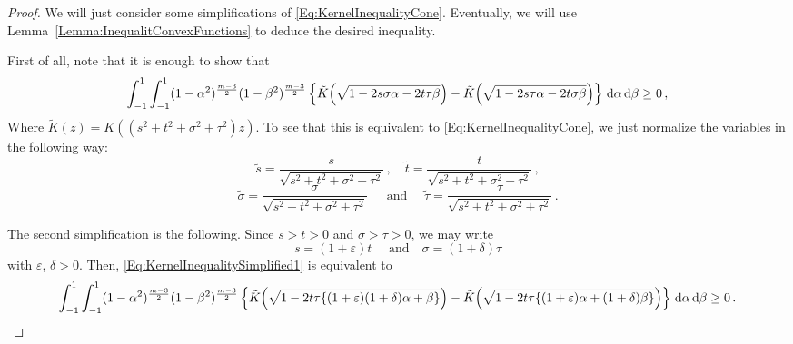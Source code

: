 \begin{proof}
We will just consider some simplifications of \eqref{Eq:KernelInequalityCone}. Eventually, we will
use Lemma~\ref{Lemma:InequalitConvexFunctions} to deduce the desired inequality.

First of all, note that it is enough to show that
\begin{equation}
\label{Eq:KernelInequalitySimplified1}
\int_{-1}^1  \int_{-1}^1  (1-\alpha^2)^{\frac{m-3}{2}} (1-\beta^2)^{\frac{m-3}{2}}  \left \{\tilde{K}\Big(\sqrt{1 -2 s \sigma \alpha -2 t \tau \beta}\Big) - \tilde{K}\Big(\sqrt{1 -2 s \tau \alpha -2 t \sigma \beta}\Big)  \right \}\,\mathrm{d} \alpha \,\mathrm{d} \beta \geq 0\,,
\end{equation}
Where $\tilde{K}(z) = K((s^2 + t^2 + \sigma^2 + \tau^2)z)$. To see that this is equivalent to
\eqref{Eq:KernelInequalityCone}, we just normalize the variables in the following way:
$$
\tilde{s} = \dfrac{s}{\sqrt{s^2 + t^2 + \sigma^2 + \tau^2}}\,, \quad \tilde{t} = \dfrac{t}{\sqrt{s^2 + t^2 + \sigma^2 + \tau^2}}\,,
$$
$$
\tilde{\sigma} = \dfrac{\sigma}{\sqrt{s^2 + t^2 + \sigma^2 + \tau^2}}\, \quad \textrm{ and } \quad \tilde{\tau} = \dfrac{\tau}{\sqrt{s^2 + t^2 + \sigma^2 + \tau^2}}\,.
$$

The second simplification is the following. Since $s>t>0$ and $\sigma > \tau>0$, we may write
$$
s = (1+\varepsilon) t \quad \textrm{ and} \quad \sigma = (1 + \delta) \tau
$$
with $\varepsilon$, $\delta > 0$. Then, \eqref{Eq:KernelInequalitySimplified1} is equivalent to
\begin{equation}
\label{Eq:KernelInequalitySimplified2}
\int_{-1}^1  \int_{-1}^1  (1-\alpha^2)^{\frac{m-3}{2}} (1-\beta^2)^{\frac{m-3}{2}}  \left \{\tilde{K}\Big(\sqrt{1 -2 t \tau \{(1+\varepsilon)(1+\delta) \alpha + \beta\}}\Big) - \tilde{K}\Big(\sqrt{1 -2 t \tau \{(1+\varepsilon) \alpha + (1+\delta)\beta\}}\Big)  \right \}\,\mathrm{d} \alpha \,\mathrm{d} \beta \geq 0\,.
\end{equation}


\end{proof}
